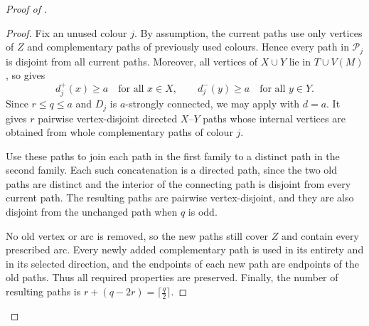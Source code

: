 \documentclass[11pt,a4paper]{article}
\theoremstyle{remark}
\numberwithin{equation}{section}
\newcommand{\calP}{\mathcal{P}}
\begin{document}
\begin{proof}[Proof of ]
\begin{proof}
			Fix an unused colour $j$. By assumption, the current paths use only vertices
			of $Z$ and complementary paths of previously used colours. Hence every path
			in $\calP_j$ is disjoint from all current paths. Moreover, all vertices of
			$X\cup Y$ lie in $T\cup V(M)$, so  gives
			\[
			d_j^+(x)\ge a\quad\text{for all }x\in X,
			\qquad
			d_j^-(y)\ge a\quad\text{for all }y\in Y.
			\]
			Since $r\le q\le a$ and $D_j$ is $a$-strongly connected, we may apply
			 with $d=a$. It gives $r$ pairwise vertex-disjoint
			directed $X$--$Y$ paths whose internal vertices are obtained from whole
			complementary paths of colour $j$.
			
			Use these paths to join each path in the first family to a distinct path in
			the second family. Each such concatenation is a directed path, since the two
			old paths are distinct and the interior of the connecting path is disjoint
			from every current path. The resulting paths are pairwise vertex-disjoint,
			and they are also disjoint from the unchanged path when $q$ is odd.
			
			No old vertex or arc is removed, so the new paths still cover $Z$ and contain
			every prescribed arc. Every newly added complementary path is used in its
			entirety and in its selected direction, and the endpoints of each new path are
			endpoints of the old paths. Thus all required properties are preserved. Finally,
			the number of resulting paths is
			$
			r+(q-2r)=\lceil \frac{q}{2}\rceil.
			$
		\end{proof}
		

\end{proof}
\end{document}
